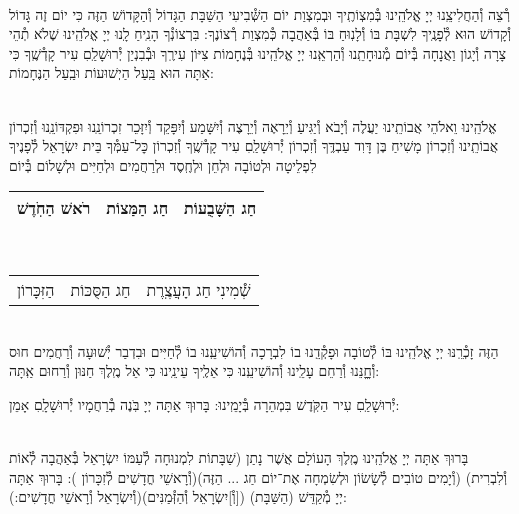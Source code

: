 \documentclass[twoside, openany, parskip=half, 11pt]{book}
\begin{document}
\vspace{-.25\baselineskip}
\begin{sometimes}

\shabbos\\
רְ֯צֵה וְ֯הַחֲלִיצֵֽנוּ יְיָ אֱלֹהֵֽינוּ בְּ֯מִצְוֹתֶֽיךָ וּבְמִצְוַת יוֹם הַשְּׁ֯בִיעִי הַשַּׁבָּת הַגָּדוֹל וְ֯הַקָּדוֹשׁ הַזֶּה כִּי יוֹם זֶה גָּדוֹל וְ֯קָדוֹשׁ הוּא לְ֯פָנֶֽיךָ לִשְׁבָּת בּוֹ וְ֯לָנֽוּחַ בּוֹ בְּ֯אַהֲבָה כְּ֯מִצְוַת רְ֯צוֹנֶךָ: בִּרְצוֹנְ֯ךָ הָנִֽיחַ לָֽנוּ יְיָ אֱלֹהֵֽינוּ שֶׁלֹא תְ֯הֵי צָרָה וְ֯יָגוֹן וַאֲנָחָה בְּ֯יוֹם מְ֯נוּחָתֵֽנוּ וְ֯הַרְאֵֽנוּ יְיָ אֱלֹהֵֽינוּ בְּ֯נֶחָמוֹת צִיּוֹן עִירֶֽךָ וּבְ֯בִנְיַן יְ֯רוּשָׁלַֽםִ עִיר קָדְ֯שֶֽׁךָ כִּי אַתָּה הוּא בַּֽעַל הַיְשׁוּעוֹת וּבַֽעַל הַנֶּחָמוֹת:


\sepline %

\vspace{-.25\baselineskip}
\\
אֱלֹהֵֽינוּ וֵאלֹהֵי אֲבוֹתֵֽינוּ יַעֲלֶה וְ֯יָבֹא וְ֯יַגִּיעַ וְ֯יֵרָאֶה וְ֯יֵרָצֶה וְ֯יִשָּׁמַע וְ֯יִפָּקֵד וְ֯יִזָּכֵר זִכְרוֹנֵֽנוּ וּפִקְדּוֹנֵֽנוּ וְ֯זִכְרוֹן אֲבוֹתֵֽינוּ וְ֯זִכְרוֹן מָשִׁיחַ בֶּן דָּוִד עַבְדֶּֽךָ וְ֯זִכְרוֹן יְ֯רוּשָׁלַֽםִ עִיר קָדְ֯שֶֽׁךָ וְ֯זִכְרוֹן כׇּל־עַמְּ֯ךָ בֵּית יִשְׂרָאֵל לְ֯פָנֶיךָ לִפְלֵיטָה וּלְטוֹבָה וּלְחֵן וּלְחֶֽסֶד וּלְרַחֲמִים וּלְחַיִּים וּלְשָׁלוֹם בְּ֯יוֹם\\
\begin{tabular}{c|c|c}
רֹאשׁ הַחֹֽדֶשׁ & חַג הַמַּצוֹת & חַג הַשָּׁבֻעוֹת\\ \hline
\end{tabular}\\
\begin{tabular}{c|c|c}
הַזִּכָּרוֹן & חַג הַסֻּכּוֹת & שְׁ֯מִינִי חַג הָעֲצֶֽרֶת
\end{tabular}\\
הַזֶּה זָכְ֯רֵֽנּוּ יְיָ אֱלֹהֵֽינוּ בּוֹ לְ֯טוֹבָה וּפָקְ֯דֵֽנוּ בוֹ לִבְרָכָה וְ֯הוֹשִׁיעֵֽנוּ בוֹ לְ֯חַיִּים וּבִדְבַר יְ֯שׁוּעָה וְ֯רַחֲמִים חוּס וְ֯חׇׇׇנֵּנוּ וְ֯רַחֵם עָלֵֽינוּ וְ֯הוֹשִׁיעֵֽנוּ כִּי אֵלֶֽיךָ עֵינֵֽינוּ כִּי אֵל מֶֽלֶךְ חַנּוּן וְ֯רַחוּם אַֽתָּה:

\end{sometimes}

יְ֯רוּשָׁלַֽםִ עִיר הַקֹּֽדֶשׁ בִּמְהֵרָה בְּ֯יָמֵֽינוּ: בָּרוּךְ אַתָּה יְיָ בֹּֽנֶה בְ֯רַחֲמָיו יְ֯רוּשָׁלָֽםִ אָמֵן:

\begin{sometimes}

\\
בָּרוּךְ אַתָּה יְיָ אֱלֹהֵֽינוּ מֶֽלֶךְ הָעוֹלָם אֲשֶׁר נָתַן (שַׁבָּתוֹת לִמְנוּחָה לְ֯עַמּוֹ יִשְׂרָאֵל בְּ֯אַהֲבָה לְ֯אוֹת וְ֯לִבְרִית)
(וְ֯יָמִים טוֹבִים לְ֯שָׂשׂוֹן וּלְשִׂמְחָה אֶת־יוֹם חַג ... הַזֶּה)(וְ֯רָאשֵׁי חֳדָשִׁים לְ֯זִכָּרוֹן ):
בָּרוּךְ אַתָּה יְיָ מְ֯קַדֵּשׁ (הַשַּׁבָּת) ([וְ֯]יִשְׂרָאֵל וְ֯הַזְּ֯מַנִּים)(וְ֯יִשְׂרָאֵל וְ֯רָאשֵׁי חֳדָשִׁים:):

\end{sometimes}
\end{document}

